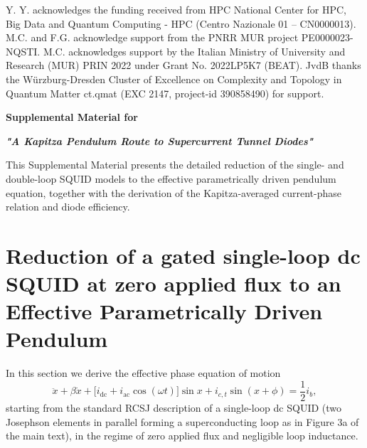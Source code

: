\documentclass[prl,twocolumn,superscriptaddress,showpacs,nofootinbib]{revtex4-2}
\begin{document}
Y. Y. acknowledges the funding received from HPC National Center for HPC, Big Data and Quantum Computing - HPC (Centro Nazionale 01 – CN0000013). M.C. and F.G. acknowledge support from the PNRR MUR project PE0000023-NQSTI.
M.C. acknowledges support by the Italian Ministry of University and Research (MUR) PRIN 2022 under Grant No. 2022LP5K7 (BEAT).
JvdB thanks the W\"urzburg-Dresden Cluster of Excellence on Complexity and Topology in Quantum Matter ct.qmat (EXC 2147, project-id 390858490) for support.




\clearpage
\widetext
\onecolumngrid

\renewcommand{\thefigure}{S\arabic{figure}}
\setcounter{figure}{0}
\renewcommand{\theequation}{S\arabic{equation}}
\setcounter{equation}{0}

\begin{center}
{\Large \bf Supplemental Material for}

{\Large \bf \textit{"A Kapitza Pendulum Route to Supercurrent Tunnel Diodes"}}
\end{center}

\maketitle

This Supplemental Material presents the detailed reduction of the single- and double-loop SQUID models to the effective parametrically driven pendulum equation, together with the derivation of the Kapitza-averaged current-phase relation and diode efficiency.

\section{Reduction of a gated single-loop dc SQUID at zero applied flux to an Effective Parametrically Driven Pendulum}
\label{sec:supp_singleloop_gate}

In this section we derive the effective phase equation of motion
\begin{equation}
\ddot x + \beta \dot x
+ \big[i_{\mathrm{dc}}+i_{\mathrm{ac}}\cos(\omega t)\big]\sin x
+ i_{c,t} \sin(x+\phi)
= \frac{1}{2} i_b ,
\label{eq:EOM_supp}
\end{equation}
starting from the standard RCSJ description of a single-loop dc SQUID
(two Josephson elements in parallel forming a superconducting loop as in Figure 3a of the main text), in the regime of zero applied flux and negligible loop inductance.
\end{document}
